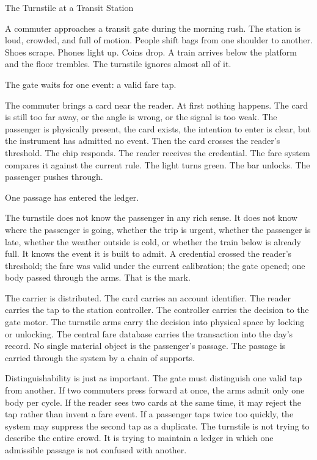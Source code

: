 \begin{coda}{The Turnstile at a Transit Station}

A commuter approaches a transit gate during the morning rush. The station is
loud, crowded, and full of motion. People shift bags from one shoulder to
another. Shoes scrape. Phones light up. Coins drop. A train arrives below the
platform and the floor trembles. The turnstile ignores almost all of it.

The gate waits for one event: a valid fare tap.

The commuter brings a card near the reader. At first nothing happens. The card
is still too far away, or the angle is wrong, or the signal is too weak. The
passenger is physically present, the card exists, the intention to enter is
clear, but the instrument has admitted no event. Then the card crosses the
reader's threshold. The chip responds. The reader receives the credential. The
fare system compares it against the current rule. The light turns green. The
bar unlocks. The passenger pushes through.

One passage has entered the ledger.

The turnstile does not know the passenger in any rich sense. It does not know
where the passenger is going, whether the trip is urgent, whether the passenger
is late, whether the weather outside is cold, or whether the train below is
already full. It knows the event it is built to admit. A credential crossed the
reader's threshold; the fare was valid under the current calibration; the gate
opened; one body passed through the arms. That is the mark.

The carrier is distributed. The card carries an account identifier. The reader
carries the tap to the station controller. The controller carries the decision
to the gate motor. The turnstile arms carry the decision into physical space by
locking or unlocking. The central fare database carries the transaction into
the day's record. No single material object is the passenger's passage. The
passage is carried through the system by a chain of supports.

Distinguishability is just as important. The gate must distinguish one valid tap
from another. If two commuters press forward at once, the arms admit only one
body per cycle. If the reader sees two cards at the same time, it may reject the
tap rather than invent a fare event. If a passenger taps twice too quickly, the
system may suppress the second tap as a duplicate. The turnstile is not trying
to describe the entire crowd. It is trying to maintain a ledger in which one
admissible passage is not confused with another.


\end{coda}
